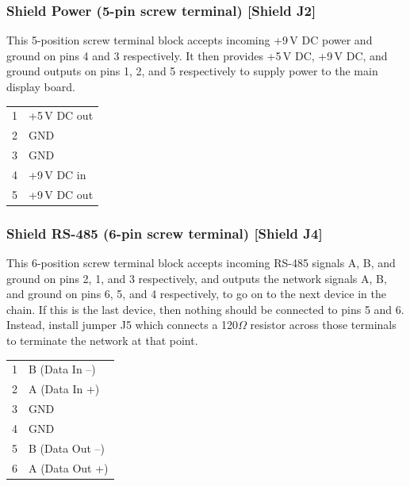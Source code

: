 {\subsubsection{Shield Power (5-pin screw terminal) [Shield J2]}
This 5-position screw terminal block accepts incoming +9\,V DC power and ground on pins 4 and 3 respectively. It then provides
+5\,V DC, +9\,V DC, and ground outputs on pins 1, 2, and 5 respectively to supply power to the main display board.
\begin{center}
	\begin{tabular}{rl}
		1&+5\,V DC out\\
		2&GND\\
		3&GND\\
		4&+9\,V DC in\\
		5&+9\,V DC out\\
	\end{tabular}
\end{center}

\subsubsection{Shield RS-485 (6-pin screw terminal) [Shield J4]}
This 6-position screw terminal block accepts incoming RS-485 signals A, B, and ground on pins 2, 1, and 3 respectively, and outputs
the network signals A, B, and ground on pins 6, 5, and 4 respectively, to go on to the next device in the chain. If this is the last
device, then nothing should be connected to pins 5 and 6. Instead, install jumper J5 which connects a 120$\Omega$ resistor across
those terminals to terminate the network at that point.
\begin{center}
	\begin{tabular}{rl}
		1&B (Data In --)\\
		2&A (Data In +)\\
		3&GND\\
		4&GND\\
		5&B (Data Out --)\\
		6&A (Data Out +)\\
	\end{tabular}
\end{center}
}

%                                                         
